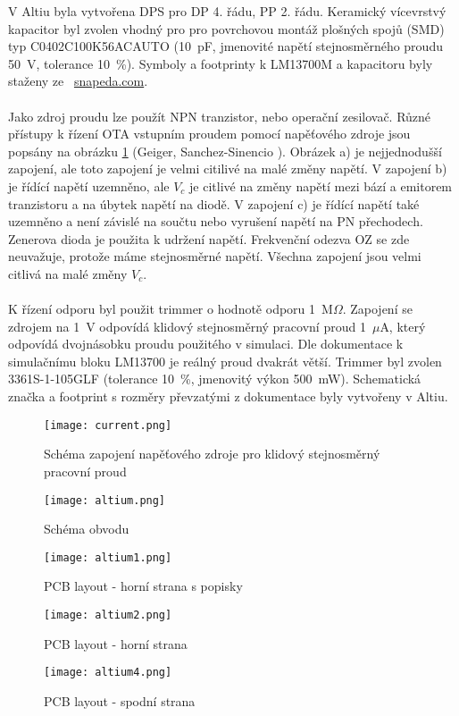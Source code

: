 \noindent V Altiu byla vytvořena DPS pro DP 4. řádu, PP 2. řádu. Keramický vícevrstvý kapacitor byl zvolen vhodný pro pro povrchovou montáž plošných spojů (SMD) typ C0402C100K56ACAUTO (10~pF, jmenovité napětí stejnosměrného proudu 50~V, tolerance 10~\%). Symboly a footprinty k LM13700M a kapacitoru byly staženy ze~ \url{snapeda.com}. \\
\\
Jako zdroj proudu lze použít NPN tranzistor, nebo operační zesilovač. Různé přístupy k řízení OTA vstupním proudem pomocí napěťového zdroje jsou popsány na obrázku \ref{s:DC} (Geiger, Sanchez-Sinencio \cite{25}). Obrázek a) je nejjednodušší zapojení, ale toto zapojení je velmi citilivé na malé změny napětí. V zapojení b) je řídící napětí uzemněno, ale $V_c$ je citlivé na změny napětí mezi bází a emitorem tranzistoru a na úbytek napětí na diodě. V zapojení c) je řídící napětí také uzemněno a není závislé na součtu nebo vyrušení napětí na PN přechodech. Zenerova dioda je použita k udržení napětí. Frekvenční odezva OZ se zde neuvažuje, protože máme stejnosměrné napětí. Všechna zapojení jsou velmi citlivá na malé změny $V_c$. \\
\\
K řízení odporu byl použit trimmer o hodnotě odporu 1~M$\Omega$. Zapojení se zdrojem na 1~V odpovídá klidový stejnosměrný pracovní proud 1~$\mu$A, který odpovídá dvojnásobku proudu použitého v simulaci. Dle dokumentace k simulačnímu bloku LM13700 je reálný proud dvakrát větší. Trimmer byl zvolen 3361S-1-105GLF (tolerance 10~\%, jmenovitý výkon 500~mW). Schematická značka a footprint s rozměry převzatými z dokumentace byly vytvořeny v Altiu.
\begin{figure}[h]
\centering
\texttt{[image: current.png]}
\caption{Schéma zapojení napěťového zdroje pro klidový stejnosměrný pracovní proud \label{s:DC}}
\end{figure}
\begin{figure}[h]
\centering
\texttt{[image: altium.png]}
\caption{Schéma obvodu}
\end{figure}
\begin{figure}[h]
\centering
\texttt{[image: altium1.png]}
\caption{PCB layout - horní strana s popisky}
\end{figure}
\begin{figure}[h]
\centering
\texttt{[image: altium2.png]}
\caption{PCB layout - horní strana}
\end{figure}
\begin{figure}[h]
\centering
\texttt{[image: altium4.png]}
\caption{PCB layout - spodní strana}
\end{figure}